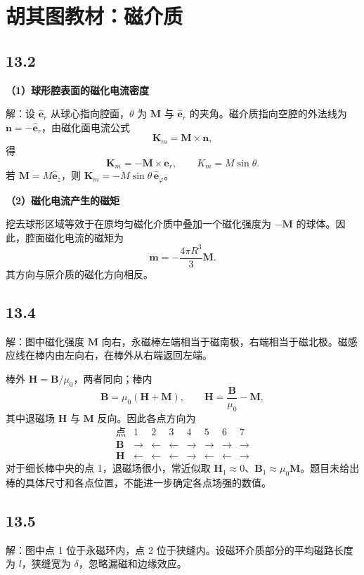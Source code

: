 \documentclass[UTF8,a4paper,12pt]{ctexart}
\newcommand{\ez}{\hat{\bm e}_z}
\newcommand{\er}{\hat{\bm e}_r}
\newcommand{\ep}{\hat{\bm e}_{\varphi}}
\begin{document}
\section*{胡其图教材：磁介质}

\subsection*{13.2}

\textbf{（1）球形腔表面的磁化电流密度}

解：设 $\er$ 从球心指向腔面，$\theta$ 为 $\bm M$ 与 $\er$ 的夹角。磁介质指向空腔的外法线为 $\bm n=-\er$，由磁化面电流公式
\[
\bm K_m=\bm M\times\bm n,
\]
得
\[
\boxed{\bm K_m=-\bm M\times\er},
\qquad
\boxed{K_m=M\sin\theta}.
\]
若 $\bm M=M\ez$，则 $\bm K_m=-M\sin\theta\,\ep$。

\textbf{（2）磁化电流产生的磁矩}

挖去球形区域等效于在原均匀磁化介质中叠加一个磁化强度为 $-\bm M$ 的球体。因此，腔面磁化电流的磁矩为
\[
\boxed{\bm m=-\frac{4\pi R^3}{3}\bm M}.
\]
其方向与原介质的磁化方向相反。

\subsection*{13.4}

解：图中磁化强度 $\bm M$ 向右，永磁棒左端相当于磁南极，右端相当于磁北极。磁感应线在棒内由左向右，在棒外从右端返回左端。

棒外 $\bm H=\bm B/\mu_0$，两者同向；棒内
\[
\bm B=\mu_0(\bm H+\bm M),
\qquad
\bm H=\frac{\bm B}{\mu_0}-\bm M,
\]
其中退磁场 $\bm H$ 与 $\bm M$ 反向。因此各点方向为
\[
\begin{array}{c|ccccccc}
\text{点} & 1&2&3&4&5&6&7\\ \hline
\bm B & \rightarrow&\leftarrow&\leftarrow&\rightarrow&\rightarrow&\rightarrow&\rightarrow\\
\bm H & \leftarrow&\leftarrow&\leftarrow&\rightarrow&\leftarrow&\leftarrow&\rightarrow
\end{array}
\]
对于细长棒中央的点 1，退磁场很小，常近似取 $\bm H_1\approx0$、$\bm B_1\approx\mu_0\bm M$。题目未给出棒的具体尺寸和各点位置，不能进一步确定各点场强的数值。

\subsection*{13.5}

解：图中点 1 位于永磁环内，点 2 位于狭缝内。设磁环介质部分的平均磁路长度为 $l$，狭缝宽为 $\delta$，忽略漏磁和边缘效应。
\end{document}
